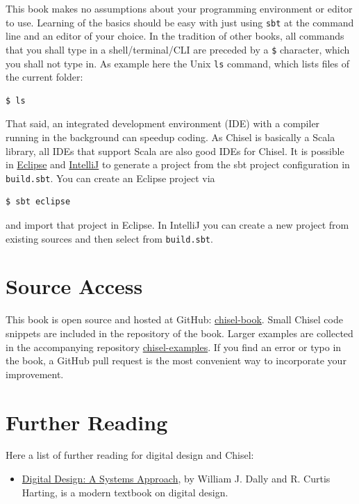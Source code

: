 \documentclass[%
    10pt, %
    headinclude, footexclude,
    openright, %
    notitlepage,
    cleardoubleempty,
    headsepline,
    pointlessnumbers,
    bibtotoc, idxtotoc,
    ]{scrbook}
\newcommand{\code}[1]{{\small{\texttt{#1}}}}
\newcommand{\myref}[2]{\href{#1}{#2}}
\begin{document}
This book makes no assumptions about your programming environment or editor to use.
Learning of the basics should be easy with just using \code{sbt} at the command line
and an editor of your choice. In the tradition of other books, all commands that you
shall type in a shell/terminal/CLI are preceded by a \code{\$} character, which you
shall not type in. As example here the Unix \code{ls} command, which lists files of
the current folder:

\begin{verbatim}
$ ls
\end{verbatim}

That said, an integrated development environment (IDE) with a compiler running in
the background can speedup coding. As Chisel is basically a Scala library, all IDEs
that support Scala are also good IDEs for Chisel.
It is possible in \myref{https://www.eclipse.org/}{Eclipse} and
\myref{https://www.jetbrains.com/help/idea/discover-intellij-idea-for-scala.html}{IntelliJ}
to generate a project from the sbt project configuration in \code{build.sbt}.
You can create an Eclipse project via
\begin{verbatim}
$ sbt eclipse
\end{verbatim}
and import that project in Eclipse.
In IntelliJ you can create a new project from existing sources and then select from \code{build.sbt}.

\section{Source Access}

This book is open source and hosted at GitHub: \myref{https://github.com/schoeberl/chisel-book}{chisel-book}.
Small Chisel code snippets are included in the repository of the book.
Larger examples are collected in the accompanying repository \myref{https://github.com/schoeberl/chisel-examples}{chisel-examples}. If you find an error or typo in the book, a GitHub pull request is the most convenient way
to incorporate your improvement.

\section{Further Reading}

Here a list of further reading for digital design and Chisel:
\begin{itemize}
\item \myref{http://www.cambridge.org/es/academic/subjects/engineering/circuits-and-systems/digital-design-systems-approach}{Digital Design: A Systems Approach}, by William J. Dally and R. Curtis Harting,
is a modern textbook on digital design.
\end{itemize}
\end{document}
